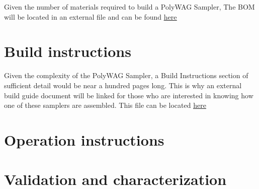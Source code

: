\documentclass[11pt, letterpaper]{article}
\begin{document}

Given the number of materials required to build a PolyWAG Sampler, The BOM will be located in an external file and can be found \href{https://docs.google.com/spreadsheets/d/1WZbGYL1k3ne1a8Z1YOA0necr3MgxMj_BiEK7JuaGnzE/edit#gid=1118434588}{\underline{here}}


\section{Build instructions}

Given the complexity of the PolyWAG Sampler, a Build Instructions section of sufficient detail would be near a hundred pages long. This is why an external build guide document will be linked for those who are interested in knowing how one of these samplers are assembled. This file can be located \href{https://drive.google.com/file/d/1QSpYj-N6-jE-VbXLVelzRzzdIF1lMkuC/view?usp=sharing}{\underline{here}}

\section{Operation instructions}





\section{Validation and characterization}
\end{document}
